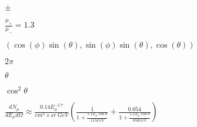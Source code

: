\documentclass{article}
\begin{document}
$ \pm $
\pagebreak

$ \frac{\mu_{+}}{\mu_{-}} = 1.3 $
\pagebreak

$ (\cos(\phi)\sin(\theta),\sin(\phi)\sin(\theta),\cos(\theta)) $
\pagebreak

$ 2 \pi $
\pagebreak

$ \theta $
\pagebreak

$ \cos^2{\theta} $
\pagebreak

$ \frac{dN_{\mu}}{dE_{\mu} d \Omega} \approx \frac{0.14 E_{\mu}^{-2.7}}{cm^2 \; s \;sr \; GeV} \left( \frac{1}{1+\frac{1.1 E_{\mu}\cos{\theta}}{115 GeV}} + \frac{0.054}{1+\frac{1.1 E_{\mu}\cos{\theta}}{850 GeV}} \right)$
\pagebreak
\end{document}
